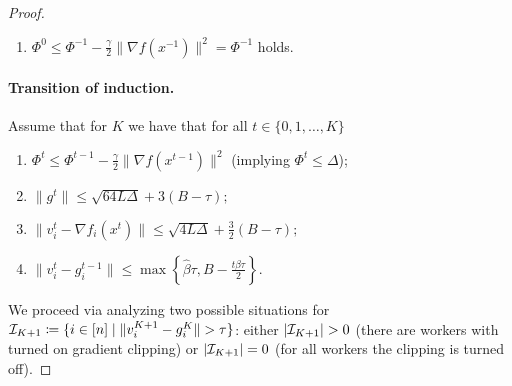 \documentclass[a4paper,11pt]{article}
\begin{document}
\begin{proof}
\begin{enumerate}
         \item $\Phi^0 \le \Phi^{-1} - \frac{\gamma}{2}\|\nabla f(x^{-1})\|^2 = \Phi^{-1}$ holds.

    \end{enumerate}

    \paragraph{Transition of induction.}

    Assume that for $K$ we have that for all $t\in \{0,1,\ldots, K\}$
    \begin{enumerate}
        \item $\Phi^{t} \le \Phi^{t-1} - \frac{\gamma}{2}\|\nabla f(x^{t-1})\|^2$ (implying $\Phi^{t} \leq \Delta$);
        \item $\|g^t\| \le \sqrt{64L\Delta} + 3(B-\tau);$
        \item $\|v_i^t - \nabla f_i(x^t)\| \le \sqrt{4L\Delta} + \frac{3}{2}(B-\tau);$
        \item $\|v_i^t - g_i^{t-1}\| \le \max\left\{\hat{\beta}\tau, B -\frac{t\hat{\beta}\tau}{2}\right\}.$
    \end{enumerate}

    We proceed via analyzing two possible situations for $\mathcal{I}_{K+1} \coloneqq \{i\in[n]\mid \|v_i^{K+1} - g_i^{K}\| > \tau\}$: either $|\mathcal{I}_{K+1}| > 0$ (there are workers with turned on gradient clipping) or $|\mathcal{I}_{K+1}| = 0$ (for all workers the clipping is turned off).
    

\end{proof}
\end{document}
